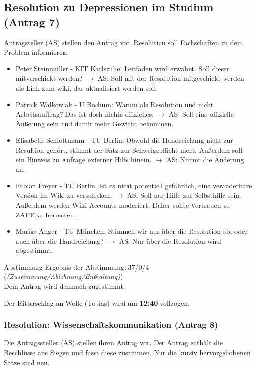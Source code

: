   \subsection{Resolution zu Depressionen im Studium (Antrag 7)}
    Antragsteller (AS) stellen den Antrag vor. Resolution soll Fachschaften zu dem Problem informieren.

    \begin{itemize}
      \item Peter Steinmüller - KIT Karlsruhe: Leitfaden wird erwähnt. Soll dieser mitverschickt werden?
        $\rightarrow$ AS: Soll mit der Resolution mitgeschickt werden als Link zum wiki, das aktualisiert werden soll.
      \item Patrick Walkowiak - U Bochum: Warum als Resolution und nicht Arbeitsauftrag? Das ist doch nichts offizielles.
        $\rightarrow$ AS: Soll eine offizielle Äußerung sein und damit mehr Gewicht bekommen.
      \item Elisabeth Schlottmann - TU Berlin: Obwohl die Handreichung nicht zur Resultion gehört, stimmt der Satz zur Schweigepflicht nicht. Außerdem soll ein Hinweis zu Anfrage externer Hilfe hinein.
        $\rightarrow$ AS: Nimmt die Änderung an.
      \item Fabian Freyer - TU Berlin: Ist es nicht potentiell gefährlich, eine veränderbare Version im Wiki zu verschicken.
        $\rightarrow$ AS: Soll nur Hilfe zur Selbsthilfe sein. Außerdem werden Wiki-Accounts moderiert. Daher sollte Vertrauen zu ZAPFika herrschen.
      \item Marius Anger - TU München: Stimmen wir nur über die Resolution ab, oder auch über die Handreichung?
        $\rightarrow$ AS: Nur über die Resolution wird abgestimmt.
    \end{itemize}

    \begin{success}{Abstimmung}
      Ergebnis der Abstimmung: 37/0/4 (\textit{(Zustimmung/Ablehnung/Enthaltung)}) \\
      Dem Antrag wird demnach zugestimmt.
    \end{success}

    Der Ritterschlag an Wolle (Tobias) wird um \textbf{12:40} vollzogen.

  \subsubsection{Resolution: Wissenschaftskommunikation (Antrag 8)}
    Die Antragssteller (AS) stellen ihren Antrag vor.
    Der Antrag enthält die Beschlüsse aus Siegen und fasst diese zusammen.
    Nur die kursiv hervorgehobenen Sätze sind neu.

